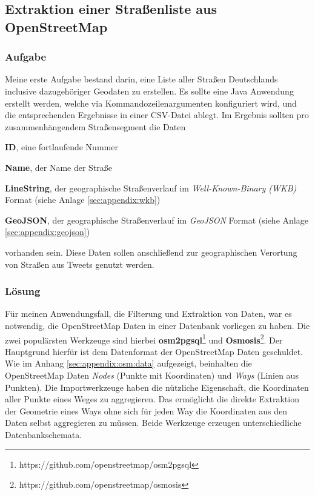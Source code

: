 \subsection{Extraktion einer Straßenliste aus OpenStreetMap}

\subsubsection{Aufgabe}
Meine erste Aufgabe bestand darin, eine Liste aller Straßen Deutschlands inclusive dazugehöriger Geodaten zu erstellen.
Es sollte eine Java Anwendung erstellt werden, welche via Kommandozeilenargumenten konfiguriert wird, und die entsprechenden Ergebnisse in einer CSV-Datei ablegt.
Im Ergebnis sollten pro zusammenhängendem Straßensegment die Daten
\begin{compactitem}
  \item \textbf{ID}, eine fortlaufende Nummer
  \item \textbf{Name}, der Name der Straße
  \item \textbf{LineString}, der geographische Straßenverlauf im \textit{Well-Known-Binary (WKB)} Format (siehe Anlage \ref{sec:appendix:wkb})
  \item \textbf{GeoJSON}, der geographische Straßenverlauf im \textit{GeoJSON} Format (siehe Anlage \ref{sec:appendix:geojson})
\end{compactitem}
vorhanden sein.
Diese Daten sollen anschließend zur geographischen Verortung von Straßen aus Tweets genutzt werden.

\subsubsection{Lösung}
Für meinen Anwendungsfall, die Filterung und Extraktion von Daten, war es notwendig, die OpenStreetMap Daten in einer Datenbank vorliegen zu haben.
Die zwei populärsten Werkzeuge sind hierbei \textbf{osm2pgsql}\footnote{https://github.com/openstreetmap/osm2pgsql} und \textbf{Osmosis}\footnote{https://github.com/openstreetmap/osmosis}.
Der Hauptgrund hierfür ist dem Datenformat der OpenStreetMap Daten geschuldet. Wie im Anhang \ref{sec:appendix:osm:data} aufgezeigt, beinhalten die OpenStreetMap Daten \textit{Nodes} (Punkte mit Koordinaten) und \textit{Ways} (Linien aus Punkten). Die Importwerkzeuge haben die nützliche Eigenschaft, die Koordinaten aller Punkte eines Weges zu aggregieren.
Das ermöglicht die direkte Extraktion der Geometrie eines Ways ohne sich für jeden Way die Koordinaten aus den Daten selbst aggregieren zu müssen.
Beide Werkzeuge erzeugen unterschiedliche Datenbankschemata.

